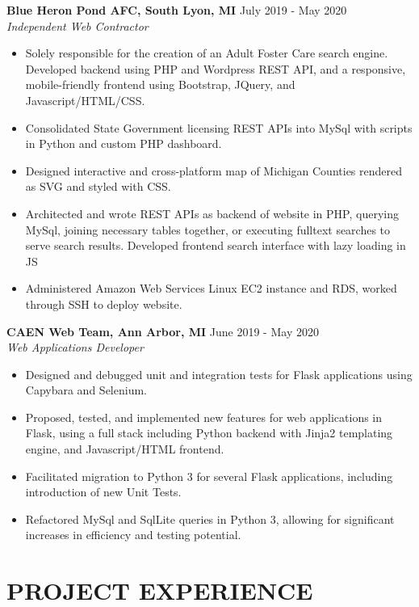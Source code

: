 \documentclass[overlapped]{res}
\begin{document}
\begin{resume}
    \textbf{Blue Heron Pond AFC, South Lyon, MI}
    \hfill July 2019 - May 2020 \\
    {\sl Independent Web Contractor}
    \begin{itemize}  \itemsep -2pt %
        \item Solely responsible for the creation of an Adult Foster Care search engine.
              Developed backend using PHP and Wordpress REST API, and a responsive, mobile-friendly frontend using Bootstrap, JQuery, and Javascript/HTML/CSS.
        \item Consolidated State Government licensing REST APIs into MySql with scripts in Python and custom PHP dashboard.
        \item Designed interactive and cross-platform map of Michigan Counties rendered as SVG and styled with CSS.
        \item Architected and wrote REST APIs as backend of website in PHP, querying MySql, joining necessary tables together, or executing fulltext searches to serve search results. Developed frontend search interface with lazy loading in JS
        \item Administered Amazon Web Services Linux EC2 instance and RDS, worked through SSH to deploy website.
    \end{itemize}
    
    \textbf{CAEN Web Team, Ann Arbor, MI}
    \hfill June 2019 - May 2020 \\
    {\sl Web Applications Developer}
    \begin{itemize}  \itemsep -2pt %
        \item Designed and debugged unit and integration tests for Flask applications using Capybara and Selenium.
        \item Proposed, tested, and implemented new features for web applications in Flask, using a full stack including Python backend with Jinja2 templating engine, and Javascript/HTML frontend.
        \item Facilitated migration to Python 3 for several Flask applications, including introduction of new Unit Tests.
        \item Refactored MySql and SqlLite queries in Python 3, allowing for significant increases in efficiency and testing potential.

    \end{itemize}
    
    \section{PROJECT EXPERIENCE}
    

\end{resume}
\end{document}
